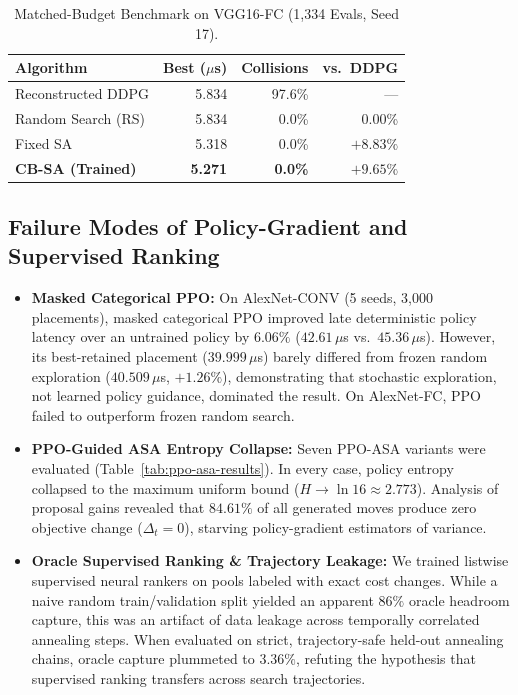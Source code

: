 \documentclass[10pt,conference]{IEEEtran}
\begin{document}
\begin{table}[t]
  \caption{Matched-Budget Benchmark on VGG16-FC (1,334 Evals, Seed 17).}
  \label{tab:matched-ddpg}
  \centering
  \footnotesize
  \setlength{\tabcolsep}{3.5pt}
  \begin{tabular}{lrrr}
    \toprule
    Algorithm & Best ($\mu$s) & Collisions & vs.\ DDPG \\
    \midrule
    Reconstructed DDPG & 5.834 & 97.6\% & --- \\
    Random Search (RS) & 5.834 & 0.0\% & 0.00\% \\
    Fixed SA           & 5.318 & 0.0\% & $+8.83\%$ \\
    \textbf{CB-SA (Trained)} & \textbf{5.271} & \textbf{0.0\%} & $\mathbf{+9.65\%}$ \\
    \bottomrule
  \end{tabular}
\end{table}

\subsection{Failure Modes of Policy-Gradient and Supervised Ranking}
\begin{itemize}
  \item \textbf{Masked Categorical PPO:} On AlexNet-CONV (5 seeds, 3,000 placements), masked categorical PPO improved late deterministic policy latency over an untrained policy by $6.06\%$ ($42.61\,\mu$s vs.\ $45.36\,\mu$s). However, its best-retained placement ($39.999\,\mu$s) barely differed from frozen random exploration ($40.509\,\mu$s, $+1.26\%$), demonstrating that stochastic exploration, not learned policy guidance, dominated the result. On AlexNet-FC, PPO failed to outperform frozen random search.
  \item \textbf{PPO-Guided ASA Entropy Collapse:} Seven PPO-ASA variants were evaluated (Table~\ref{tab:ppo-asa-results}). In every case, policy entropy collapsed to the maximum uniform bound ($H \to \ln 16 \approx 2.773$). Analysis of proposal gains revealed that $84.61\%$ of all generated moves produce zero objective change ($\Delta_t = 0$), starving policy-gradient estimators of variance.
  \item \textbf{Oracle Supervised Ranking \& Trajectory Leakage:} We trained listwise supervised neural rankers on pools labeled with exact cost changes. While a naive random train/validation split yielded an apparent $86\%$ oracle headroom capture, this was an artifact of data leakage across temporally correlated annealing steps. When evaluated on strict, trajectory-safe held-out annealing chains, oracle capture plummeted to $3.36\%$, refuting the hypothesis that supervised ranking transfers across search trajectories.
\end{itemize}
\end{document}
